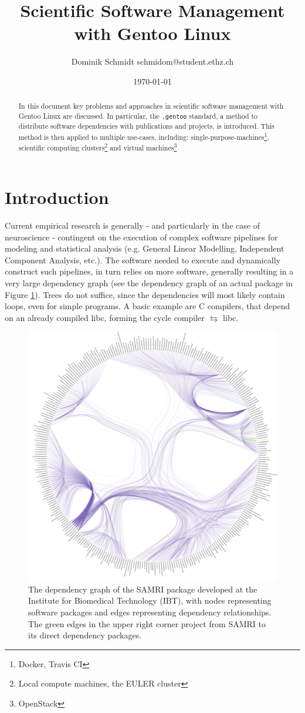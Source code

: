 \documentclass[11pt]{scrartcl}
\author{Dominik Schmidt \textsf{schmidom@student.ethz.ch}}
\title{Scientific Software Management with Gentoo Linux}
\date{\today}
\newcommand{\dg}[1]{\texttt{#1}}
\begin{document}
	\maketitle
	\begin{abstract}
		In this document key problems and approaches in scientific
		software management with Gentoo Linux are discussed.
		In particular, the \dg{.gentoo} standard, a method to distribute software dependencies with publications and projects, is introduced.
		This method is then applied to multiple use-cases, including:
		single-purpose-machines\footnote{Docker, Travis CI},
		scientific computing clusters\footnote{Local compute machines, the EULER cluster}
		and virtual machines\footnote{OpenStack}
	\end{abstract}
	\section{Introduction}
		Current empirical research is generally - and particularly in the case of neuroscience - contingent on the execution of complex software pipelines for modeling and statistical analysis (e.g. General Linear Modelling, Independent Component Analysis, etc.).
		The software needed to execute and dynamically construct such pipelines, in turn relies on more software, generally resulting in a very large dependency graph (see the dependency graph of an actual package in Figure \ref{fig:real_depgraph}).
		Trees do not suffice, since the dependencies will most likely contain loops, even for simple programs. A basic example are C compilers, that depend on an already compiled libc, forming the cycle compiler $\leftrightarrows$ libc.

		\begin{figure}[h]
			\centering
			\includegraphics[width=0.75\linewidth]{graph/Real_Dependencygraph/RealDepgraph2.png}
			\caption[The dependency graph of the SAMRI package]{The dependency graph of the SAMRI package developed at the Institute for Biomedical Technology (IBT), with nodes representing software packages and edges representing dependency relationships.  The green edges in the upper right corner project from SAMRI to its direct dependency packages.}
			\label{fig:real_depgraph}
		\end{figure}
		
\end{document}
